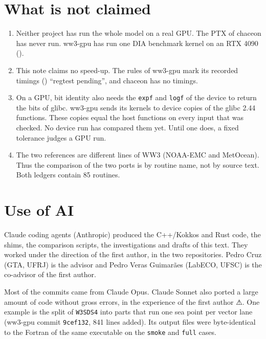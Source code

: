 \documentclass[10pt,a4paper,]{article}
\providecommand{\tightlist}{\setlength{\itemsep}{0pt}\setlength{\parskip}{0pt}}
\begin{document}
\section{What is not claimed}\label{sec:limits}

\begin{enumerate}
\def\labelenumi{\arabic{enumi}.}
\tightlist
\item
  Neither project has run the whole model on a real GPU. The PTX of
  chaceon has never run. ww3-gpu has run one DIA benchmark kernel on an
  RTX 4090 ().
\item
  This note claims no speed-up. The rules of ww3-gpu mark its recorded
  timings () ``regtest
  pending'', and chaceon has no timings.
\item
  On a GPU, bit identity also needs the \texttt{expf} and \texttt{logf}
  of the device to return the bits of glibc. ww3-gpu sends its kernels
  to device copies of the glibc 2.44 functions. These copies equal the
  host functions on every input that was checked. No device run has
  compared them yet. Until one does, a fixed tolerance judges a GPU run.
\item
  The two references are different lines of WW3 (NOAA-EMC and MetOcean).
  Thus the comparison of the two ports is by routine name, not by source
  text. Both ledgers contain 85 routines.
\end{enumerate}

\section{Use of AI}\label{sec:ai}

Claude coding agents (Anthropic) produced the C++/Kokkos and Rust code,
the shims, the comparison scripts, the investigations and drafts of this
text. They worked under the direction of the first author, in the two
repositories. Pedro Cruz (GTA, UFRJ) is the advisor and Pedro Veras
Guimarães (LabECO, UFSC) is the co-advisor of the first author.

Most of the commits came from Claude Opus. Claude Sonnet also ported a
large amount of code without gross errors, in the experience of the
first author ⚠. One example is the split of \texttt{W3SDS4} into parts
that run one sea point per vector lane (ww3-gpu commit \texttt{9cef132},
841 lines added). Its output files were byte-identical to the Fortran of
the same executable on the \texttt{smoke} and \texttt{full} cases.
\end{document}
